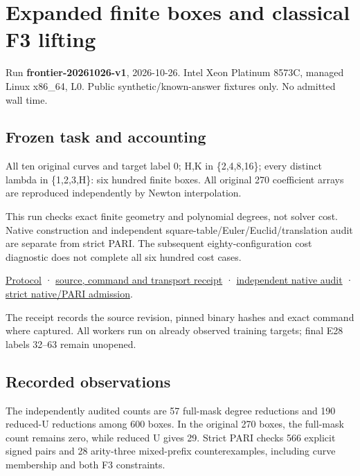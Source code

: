 \documentclass[
  10pt,
]{article}
\author{}
\date{}
\begin{document}
\section{Expanded finite boxes and classical F3
lifting}\label{expanded-finite-boxes-and-classical-f3-lifting}

Run \textbf{frontier-20261026-v1}, 2026-10-26. Intel Xeon Platinum
8573C, managed Linux x86\_64, L0. Public synthetic/known-answer fixtures
only. No admitted wall time.

\subsection{Frozen task and
accounting}\label{frozen-task-and-accounting}

All ten original curves and target label 0; H,K in \{2,4,8,16\}; every
distinct lambda in \{1,2,3,H\}: six hundred finite boxes. All original
270 coefficient arrays are reproduced independently by Newton
interpolation.

This run checks exact finite geometry and polynomial degrees, not solver
cost. Native construction and independent
square-table/Euler/Euclid/translation audit are separate from strict
PARI. The subsequent eighty-configuration cost diagnostic does not
complete all six hundred cost cases.

\href{../../../execution-v3/INCIDENCE_FRONTIER_PROTOCOL_V1.md}{Protocol}
·
\href{../../../execution-v3/frontier-20261026/TRANSPORT_LIMITS.json}{source,
command and transport receipt} ·
\href{../../../execution-v3/frontier-audit-20261026-v1/AUDIT.json}{independent
native audit} ·
\href{../../../execution-v3/frontier-audit-20261026-v1/ADMISSION.json}{strict
native/PARI admission}.

The receipt records the source revision, pinned binary hashes and exact
command where captured. All workers run on already observed training
targets; final E28 labels 32--63 remain unopened.

\subsection{Recorded observations}\label{recorded-observations}

The independently audited counts are 57 full-mask degree reductions and
190 reduced-U reductions among 600 boxes. In the original 270 boxes, the
full-mask count remains zero, while reduced U gives 29. Strict PARI
checks 566 explicit signed pairs and 28 arity-three mixed-prefix
counterexamples, including curve membership and both F3 constraints.
\end{document}
